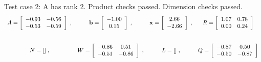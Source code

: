 {Test case 2: A has rank 2. Product checks passed. Dimension checks passed.
\[
\begin{array}{*{4}{c}}
A = \left[\begin{array}{*{2}c}
	-0.93 & -0.56\\
	-0.53 & -0.59
\end{array}\right]
\;, & 
\mathbf{b} = \left[\begin{array}{*{1}c}
	-1.00\\
	0.15
\end{array}\right]
\;, & 
\mathbf{x} = \left[\begin{array}{*{1}c}
	2.66\\
	-2.66
\end{array}\right]
\;, & 
R = \left[\begin{array}{*{2}c}
	1.07 & 0.78\\
	0.00 & 0.24
\end{array}\right]
\\
\\\mbox{}\\
N = []\;, & 
W = \left[\begin{array}{*{2}c}
	-0.86 & 0.51\\
	-0.51 & -0.86
\end{array}\right]
\;, & 
L = []\;, & 
Q = \left[\begin{array}{*{2}c}
	-0.87 & 0.50\\
	-0.50 & -0.87
\end{array}\right]
\\
\end{array}
\]
\hrulefill

}

